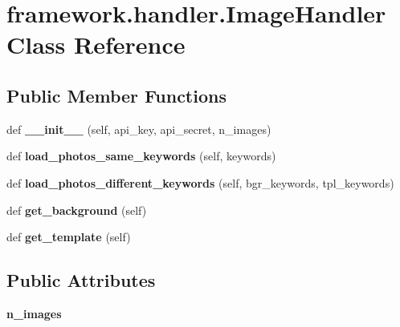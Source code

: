 \hypertarget{classframework_1_1handler_1_1ImageHandler}{}\section{framework.\+handler.\+Image\+Handler Class Reference}
\label{classframework_1_1handler_1_1ImageHandler}
\subsection*{Public Member Functions}
\begin{DoxyCompactItemize}
\item 
def {\bfseries \+\_\+\+\_\+init\+\_\+\+\_\+} (self, api\+\_\+key, api\+\_\+secret, n\+\_\+images)\hypertarget{classframework_1_1handler_1_1ImageHandler_a8afd09c10e7e3aef500c0fbe88b14459}{}\label{classframework_1_1handler_1_1ImageHandler_a8afd09c10e7e3aef500c0fbe88b14459}

\item 
def {\bfseries load\+\_\+photos\+\_\+same\+\_\+keywords} (self, keywords)\hypertarget{classframework_1_1handler_1_1ImageHandler_a7b7f852de1f4780cd6b39b69b0158d0e}{}\label{classframework_1_1handler_1_1ImageHandler_a7b7f852de1f4780cd6b39b69b0158d0e}

\item 
def {\bfseries load\+\_\+photos\+\_\+different\+\_\+keywords} (self, bgr\+\_\+keywords, tpl\+\_\+keywords)\hypertarget{classframework_1_1handler_1_1ImageHandler_a213a5aead7a1e2d1516d63f4f9b910c3}{}\label{classframework_1_1handler_1_1ImageHandler_a213a5aead7a1e2d1516d63f4f9b910c3}

\item 
def {\bfseries get\+\_\+background} (self)\hypertarget{classframework_1_1handler_1_1ImageHandler_aa65a782baf396143d02b6276665b0d96}{}\label{classframework_1_1handler_1_1ImageHandler_aa65a782baf396143d02b6276665b0d96}

\item 
def {\bfseries get\+\_\+template} (self)\hypertarget{classframework_1_1handler_1_1ImageHandler_aec6aa31081de5c55c960dcbef8befaf6}{}\label{classframework_1_1handler_1_1ImageHandler_aec6aa31081de5c55c960dcbef8befaf6}

\end{DoxyCompactItemize}
\subsection*{Public Attributes}
\begin{DoxyCompactItemize}
\item 
{\bfseries n\+\_\+images}\hypertarget{classframework_1_1handler_1_1ImageHandler_aa873eb32032c51d4f9dd4eb42bd24410}{}\label{classframework_1_1handler_1_1ImageHandler_aa873eb32032c51d4f9dd4eb42bd24410}

\end{DoxyCompactItemize}
